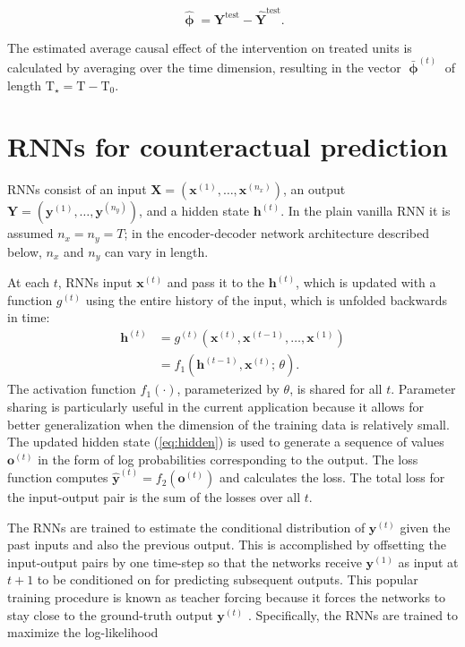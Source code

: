 \begin{equation}\label{eq:pointwise}
  \boldsymbol{\hat{\upphi}} = \boldsymbol{Y}^{\text{test}} - \boldsymbol{\hat{Y}}^{\text{test}}. 
\end{equation}

The estimated average causal effect of the intervention on treated units is calculated by averaging over the time dimension, resulting in the vector $\boldsymbol{\bar{\upphi}}^{(t)}$ of length $\text{T}_\star = \text{T}-\text{T}_0$. 

\section{RNNs for counteractual prediction} \label{RNNs-section}

RNNs \citep{graves2012,goodfellow2016deep} consist of an input $\boldsymbol{X} = \left(\boldsymbol{x}^{(1)}, \ldots, \boldsymbol{x}^{(n_x)}\right)$, an output $\boldsymbol{Y} = \left(\boldsymbol{y}^{(1)}, \ldots, \boldsymbol{y}^{(n_y)}\right)$, and a hidden state $\boldsymbol{h}^{(t)}$. In the plain vanilla RNN it is assumed $n_x = n_y = T$; in the encoder-decoder network architecture described below, $n_x$ and $n_y$ can vary in length. 

At each $t$, RNNs input $\boldsymbol{x}^{(t)}$ and pass it to the $\boldsymbol{h}^{(t)}$, which is updated with a function $g^{(t)}$ using the entire history of the input, which is unfolded backwards in time:
%
\begin{align}
\boldsymbol{h}^{(t)} &= g^{(t)} \left(\boldsymbol{x}^{(t)}, \boldsymbol{x}^{(t-1)}, \ldots, \boldsymbol{x}^{(1)} \right) \\ 
&= f_1 \left( \boldsymbol{h}^{(t-1)}, \boldsymbol{x}^{(t)}; \, \theta \right). \label{eq:hidden}
\end{align} 
The activation function $f_1 (\cdot)$, parameterized by $\theta$, is shared for all $t$. Parameter sharing is particularly useful in the current application because it allows for better generalization when the dimension of the training data is relatively small. The updated hidden state (\ref{eq:hidden}) is used to generate a sequence of values $\boldsymbol{o}^{(t)}$ in the form of log probabilities corresponding to the output. The loss function computes $\boldsymbol{\hat{y}}^{(t)} = f_2 \left(\boldsymbol{o}^{(t)}\right)$ and calculates the loss. The total loss for the input-output pair is the sum of the losses over all $t$.

The RNNs are trained to estimate the conditional distribution of $\boldsymbol{y}^{(t)}$ given the past inputs and also the previous output. This is accomplished by offsetting the input-output pairs by one time-step so that the networks receive $\boldsymbol{y}^{(1)}$  as input at $t + 1$ to be conditioned on for predicting subsequent outputs. This popular training procedure is known as teacher forcing because it forces the networks to stay close to the ground-truth output $\boldsymbol{y}^{(t)}$ \citep{lamb2016professor}. Specifically, the RNNs are trained to maximize the log-likelihood

